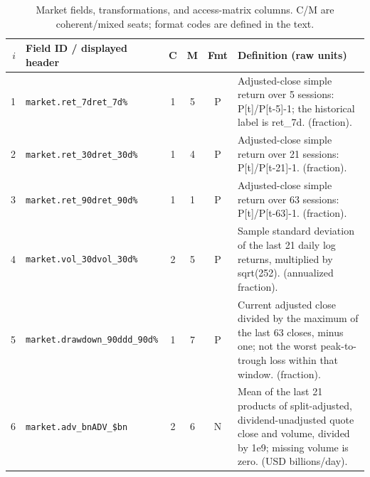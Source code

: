 \begin{table}[t]
\caption{Market fields, transformations, and access-matrix columns. C/M are coherent/mixed seats; format codes are defined in the text.}
\label{tab:repro-market}
\small
\begin{tabular}{@{}rp{}cccp{}@{}}
\toprule
$i$ & Field ID / displayed header & C & M & Fmt & Definition (raw units) \\
\midrule
1 & \texttt{market.\allowbreak{}ret\_\allowbreak{}7d}\newline \texttt{ret\_\allowbreak{}7d\%} & 1 & 5 & P & Adjusted-close simple return over 5 sessions: P[t]/P[t-5]-1; the historical label is ret\_7d. (fraction). \\[2pt]
2 & \texttt{market.\allowbreak{}ret\_\allowbreak{}30d}\newline \texttt{ret\_\allowbreak{}30d\%} & 1 & 4 & P & Adjusted-close simple return over 21 sessions: P[t]/P[t-21]-1. (fraction). \\[2pt]
3 & \texttt{market.\allowbreak{}ret\_\allowbreak{}90d}\newline \texttt{ret\_\allowbreak{}90d\%} & 1 & 1 & P & Adjusted-close simple return over 63 sessions: P[t]/P[t-63]-1. (fraction). \\[2pt]
4 & \texttt{market.\allowbreak{}vol\_\allowbreak{}30d}\newline \texttt{vol\_\allowbreak{}30d\%} & 2 & 5 & P & Sample standard deviation of the last 21 daily log returns, multiplied by sqrt(252). (annualized fraction). \\[2pt]
5 & \texttt{market.\allowbreak{}drawdown\_\allowbreak{}90d}\newline \texttt{dd\_\allowbreak{}90d\%} & 1 & 7 & P & Current adjusted close divided by the maximum of the last 63 closes, minus one; not the worst peak-to-trough loss within that window. (fraction). \\[2pt]
6 & \texttt{market.\allowbreak{}adv\_\allowbreak{}bn}\newline \texttt{ADV\_\allowbreak{}\$bn} & 2 & 6 & N & Mean of the last 21 products of split-adjusted, dividend-unadjusted quote close and volume, divided by 1e9; missing volume is zero. (USD billions/day). \\[2pt]
\bottomrule
\end{tabular}
\end{table}

